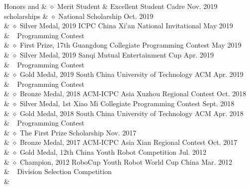 {Honors and }
& $\diamond$ Merit Student \& Excellent Student Cadre \hfill Nov. 2019 \\
{scholarships}
& $\diamond$ National Scholarship \hfill Oct. 2019 \\

& $\diamond$ Silver Medal, 2019 ICPC China Xi'an National Invitational \hfill May 2019 \\
& $\ \ $ Programming Contest \\

& $\diamond$ First Prize, 17th Guangdong Collegiate Programming Contest \hfill May 2019 \\

& $\diamond$ Silver Medal, 2019 Sanqi Mutual Entertainment Cup \hfill Apr. 2019 \\
& $\ \ $ Programming Contest \\

& $\diamond$ Gold Medal, 2019 South China University of Technology ACM \hfill Apr. 2019 \\
& $\ \ $ Programming Contest \\

& $\diamond$ Bronze Medal, 2018 ACM-ICPC Asia Xuzhou Regional Contest \hfill Oct. 2018 \\

& $\diamond$ Silver Medal, 1st Xiao Mi Collegiate Programming Contest \hfill Sept. 2018 \\

& $\diamond$ Gold Medal, 2018 South China University of Technology ACM \hfill Apr. 2018 \\
& $\ \ $ Programming Contest \\

& $\diamond$ The First Prize Scholarship \hfill Nov. 2017 \\

& $\diamond$ Bronze Medal, 2017 ACM-ICPC Asia Xian Regional Contest \hfill Oct. 2017 \\

& $\diamond$ Gold Medal, 12th China Youth Robot Competition \hfill Jul. 2012 \\

& $\diamond$ Champion, 2012 RoboCup Youth Robot World Cup China \hfill Mar. 2012 \\
& $\ \ $ Division Selection Competition \\

& \\
